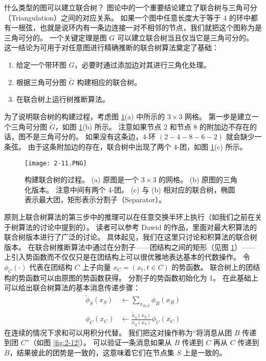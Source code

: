 什么类型的图可以建立联合树？
图论中的一个重要结论建立了联合树与三角可分（Triangulation）之间的对应关系。
如果一个图中任意长度大于等于 4 的环中都有一根弦，也就是说环内有一条边连接一对不相邻的节点，我们就把这个图称为是三角可分的。
一个关键定理是图 $G$ 可以建立联合树当且仅当它是三角可分的。
这一结论为可用于对任意图进行精确推断的联合树算法奠定了基础：

\begin{enumerate}
    \item[(1)] 给定一个带环图 $G$，必要时通过添加边对其进行三角化处理。
    \item[(2)] 根据三角可分图 $\widetilde{G}$ 构建相应的联合树。
    \item[(3)] 在联合树上运行树推断算法。
\end{enumerate}

\begin{tcolorbox}
\begin{exam}[联合树]
    为了说明联合树的构建过程，考虑图 \ref{fig:2-11}(a) 中所示的 $3 \times 3$ 网格。
    第一步是建立一个三角可分图 $\widetilde{G}$，如图 \ref{fig:2-11}(b) 所示。
    注意如果节点 2 和节点 8 的附加边不存在的话，图不是三角可分的。
    如果没有这条边，4-环 $(2-4-8-6-2)$ 就会缺少一条弦。
    由于这条附加边的存在，联合树中出现了两个 4-团，如图 \ref{fig:2-11}(c) 所示。
\end{exam}
\end{tcolorbox}

\begin{figure}[htbp]
    \centering
    \texttt{[image: 2-11.PNG]}
    \caption{
        构建联合树的过程。
        (a) 原图是一个 $3 \times 3$ 的网格。
        (b) 原图的三角化版本。
        注意中间有两个 4-团。
        (c) 与 (b) 相对应的联合树，椭圆表示最大团，矩形表示分割子（Separator）。
    }\label{fig:2-11}
\end{figure}

原则上联合树算法的第三步中的推理可以在任意交换半环上执行（如我们之前在关于树算法的讨论中提到的）。
读者可以参考 Dawid 的作品，里面对最大积算法的联合树版本进行了广泛的讨论。
具体起见，我们在这里只讨论和积算法的联合树版本。
在联合树推断算法中通过在分割子——团结构之间的矩形（见图 \ref{fig:2-11}）——上引入势函数而不仅仅只是在团结构上可以很优雅地表达基本的代数操作。
令 $\phi_C(\cdot)$ 代表在团结构 $C$ 上子向量 $x_C = (x_t, t \in C)$ 的势函数。
联合树上的团结构的势函数可以由原图的势函数获得。
分割子的势函数初始化为 1。
在此基础上可以给出联合树算法的基本消息传递步骤：
\begin{subequations}
\begin{align}
    \widetilde{\phi}_S(x_S) &\leftarrow \sum_{x_{B/S}}\phi_B(x_B) \\
    \phi_C(x_C) &\leftarrow \frac{\widetilde{\phi}_S(x_S)}{\phi_S(x_S)}\phi_C(x_C)
\end{align}
\end{subequations}
在连续的情况下求和可以用积分代替。
我们把这对操作称为“将消息从团 $B$ 传递到团 $C$”（如图 \ref{fig:2-12}）。
可以验证一条消息如果从 $B$ 传递到 $C$ 再从 $C$ 传递到 $B$，结果彼此的团势是一致的，这意味着它们在节点集 $S$ 上是一致的。

